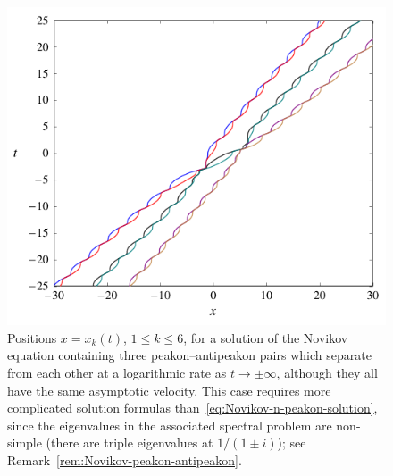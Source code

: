 \documentclass[10pt,a4paper]{article} \pdfoutput=1 
\begin{document}
\begin{figure}
  \centering \includegraphics[width=1.0\linewidth]{graphics/novikov-conjugate-triple-roots.pdf}
  \caption{Positions $x = x_k(t)$, $1 \le k \le 6$, for a solution of the Novikov equation
    containing three peakon--antipeakon pairs which
    separate from each other at a logarithmic rate as $t \to \pm\infty$,
    although they all have the same asymptotic velocity.
    This case requires more complicated solution formulas
    than~\eqref{eq:Novikov-n-peakon-solution},
    since the eigenvalues in the associated spectral problem are non-simple
    (there are triple eigenvalues at $1/(1 \pm i)$);
    see Remark~\ref{rem:Novikov-peakon-antipeakon}.}
  \label{fig:novikov-conjugate-triple-roots}
\end{figure}
\end{document}
